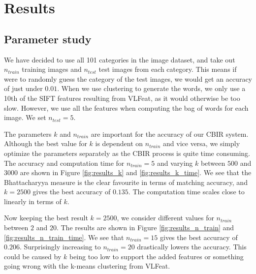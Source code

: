 \documentclass[11pt,a4paper]{article}
\begin{document}
\section{Results}

\subsection{Parameter study}

We have decided to use all 101 categories in the image dataset, and take out
$n_{train}$ training images and $n_{test}$ test images from each category.
This means if were to randomly guess the category of the test images, we would
get an accuracy of just under $0.01$. When we use clustering to generate the
words, we only use a 10th of the SIFT features resulting from VLFeat, as it
would otherwise be too slow. However, we use all the features when computing
the bag of words for each image. We set $n_{test} = 5$.

The parameters $k$ and $n_{train}$ are important for the accuracy of our
CBIR system. Although the best value for $k$ is dependent on $n_{train}$
and vice versa, we simply optimize the parameters separately as the CBIR
process is quite time consuming. The accuracy and computation time for
$n_{train} = 5$ and varying $k$ between $500$ and $3000$ are shown in
Figure \ref{fig:results_k} and \ref{fig:results_k_time}. We see that the
Bhattacharyya measure is the clear favourite in terms of matching accuracy,
and $k = 2500$ gives the best accuracy of $0.135$. The computation time scales
close to linearly in terms of $k$.

Now keeping the best result $k = 2500$, we consider different values
for $n_{train}$ between $2$ and $20$. The results are shown in Figure
\ref{fig:results_n_train} and \ref{fig:results_n_train_time}. We see that
$n_{train} = 15$ gives the best accuracy of $0.206$. Surprisingly increasing
to $n_{train} = 20$ drastically lowers the accuracy. This could be caused by
$k$ being too low to support the added features or something going wrong with
the k-means clustering from VLFeat.
\end{document}
